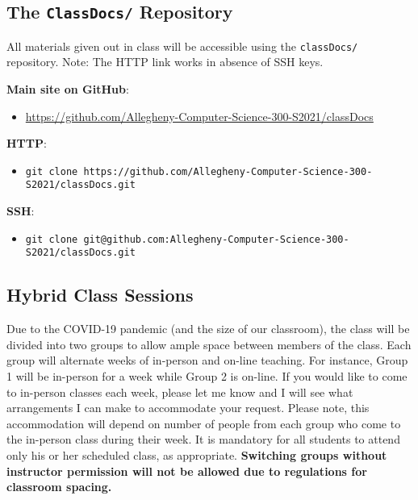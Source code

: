 \documentclass[11pt]{article} %
\begin{document}
\subsection*{\textbf{The {\tt ClassDocs/} Repository}}
All materials given out in class will be accessible using the {\tt classDocs/} repository. Note: The HTTP link works in absence of SSH keys.

\textbf{Main site on GitHub}: 
	\begin{itemize}
		\item \footnotesize \url{https://github.com/Allegheny-Computer-Science-300-S2021/classDocs}
	\end{itemize}

\textbf{HTTP}: 
	\begin{itemize}
		\item {\tt \footnotesize git clone https://github.com/Allegheny-Computer-Science-300-S2021/classDocs.git}
	\end{itemize}

\textbf{SSH}: 
	\begin{itemize}
		\item {\tt \footnotesize git clone git@github.com:Allegheny-Computer-Science-300-S2021/classDocs.git}
	\end{itemize}






\color{red}
\subsection*{\textbf{Hybrid Class Sessions}} Due to the COVID-19 pandemic (and the size of our classroom), the class will be divided into two groups to allow ample space between members of the class. Each group will alternate weeks of in-person and on-line  teaching. For instance, Group 1 will be in-person for a week while Group 2 is on-line. If you would like to come to in-person classes each week, please let me know and I will see what arrangements I can make to accommodate your request. Please note, this accommodation will depend on number of people from each group who come to the in-person class during their week. It is mandatory for all students to attend only his or her scheduled class, as appropriate. \textbf{Switching groups without instructor permission will not be allowed due to regulations for classroom spacing.}
\end{document}
